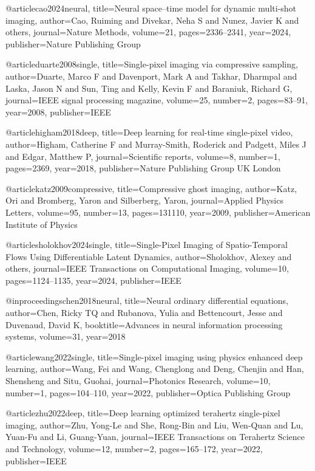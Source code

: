 @article{cao2024neural,
  title={Neural space--time model for dynamic multi-shot imaging},
  author={Cao, Ruiming and Divekar, Neha S and Nunez, Javier K and others},
  journal={Nature Methods},
  volume={21},
  pages={2336--2341},
  year={2024},
  publisher={Nature Publishing Group}
}

@article{duarte2008single,
  title={Single-pixel imaging via compressive sampling},
  author={Duarte, Marco F and Davenport, Mark A and Takhar, Dharmpal and Laska, Jason N and Sun, Ting and Kelly, Kevin F and Baraniuk, Richard G},
  journal={IEEE signal processing magazine},
  volume={25},
  number={2},
  pages={83--91},
  year={2008},
  publisher={IEEE}
}

@article{higham2018deep,
  title={Deep learning for real-time single-pixel video},
  author={Higham, Catherine F and Murray-Smith, Roderick and Padgett, Miles J and Edgar, Matthew P},
  journal={Scientific reports},
  volume={8},
  number={1},
  pages={2369},
  year={2018},
  publisher={Nature Publishing Group UK London}
}

@article{katz2009compressive,
  title={Compressive ghost imaging},
  author={Katz, Ori and Bromberg, Yaron and Silberberg, Yaron},
  journal={Applied Physics Letters},
  volume={95},
  number={13},
  pages={131110},
  year={2009},
  publisher={American Institute of Physics}
}

@article{sholokhov2024single,
  title={Single-Pixel Imaging of Spatio-Temporal Flows Using Differentiable Latent Dynamics},
  author={Sholokhov, Alexey and others},
  journal={IEEE Transactions on Computational Imaging},
  volume={10},
  pages={1124--1135},
  year={2024},
  publisher={IEEE}
}

@inproceedings{chen2018neural,
  title={Neural ordinary differential equations},
  author={Chen, Ricky TQ and Rubanova, Yulia and Bettencourt, Jesse and Duvenaud, David K},
  booktitle={Advances in neural information processing systems},
  volume={31},
  year={2018}
}

@article{wang2022single,
  title={Single-pixel imaging using physics enhanced deep learning},
  author={Wang, Fei and Wang, Chenglong and Deng, Chenjin and Han, Shensheng and Situ, Guohai},
  journal={Photonics Research},
  volume={10},
  number={1},
  pages={104--110},
  year={2022},
  publisher={Optica Publishing Group}
}

@article{zhu2022deep,
  title={Deep learning optimized terahertz single-pixel imaging},
  author={Zhu, Yong-Le and She, Rong-Bin and Liu, Wen-Quan and Lu, Yuan-Fu and Li, Guang-Yuan},
  journal={IEEE Transactions on Terahertz Science and Technology},
  volume={12},
  number={2},
  pages={165--172},
  year={2022},
  publisher={IEEE}
}


